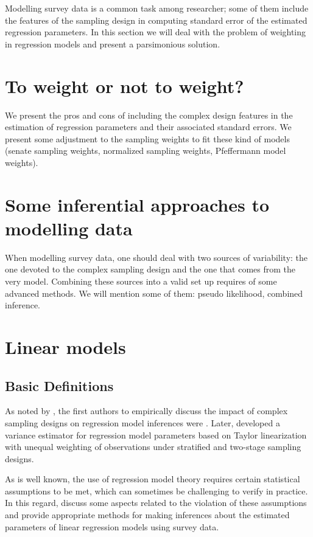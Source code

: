 \documentclass[
  12pt,
]{book}
\begin{document}
Modelling survey data is a common task among researcher; some of them include the features of the sampling design in computing standard error of the estimated regression parameters. In this section we will deal with the problem of weighting in regression models and present a parsimonious solution.

\section{To weight or not to weight?}\label{to-weight-or-not-to-weight}

We present the pros and cons of including the complex design features in the estimation of regression parameters and their associated standard errors. We present some adjustment to the sampling weights to fit these kind of models (senate sampling weights, normalized sampling weights, Pfeffermann model weights).

\section{Some inferential approaches to modelling data}\label{some-inferential-approaches-to-modelling-data}

When modelling survey data, one should deal with two sources of variability: the one devoted to the complex sampling design and the one that comes from the very model. Combining these sources into a valid set up requires of some advanced methods. We will mention some of them: pseudo likelihood, combined inference.

\section{Linear models}\label{linear-models}

\subsection{Basic Definitions}\label{basic-definitions}

As noted by \citet{Heeringa_West_Berglund_2017}, the first authors to empirically discuss the impact of complex sampling designs on regression model inferences were \citet{kish1974inference}. Later, \citet{fuller1975regression} developed a variance estimator for regression model parameters based on Taylor linearization with unequal weighting of observations under stratified and two-stage sampling designs.

As is well known, the use of regression model theory requires certain statistical assumptions to be met, which can sometimes be challenging to verify in practice. In this regard, \citet{shah1977inference} discuss some aspects related to the violation of these assumptions and provide appropriate methods for making inferences about the estimated parameters of linear regression models using survey data.
\end{document}
